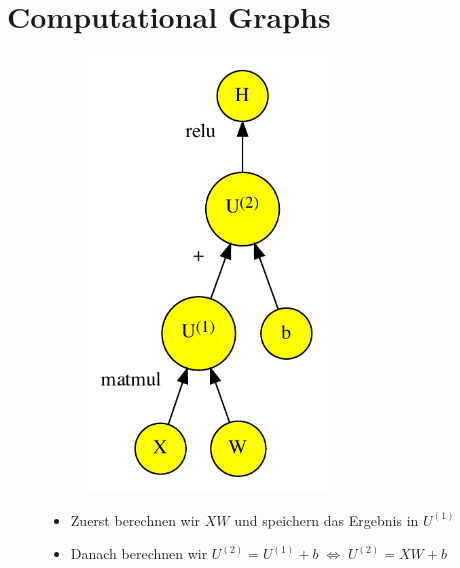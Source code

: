 \documentclass[t]{beamer}
\begin{document}
\section{Computational Graphs}
\begin{frame}
    \begin{figure}
        \centering
        \begin{minipage}{0.45\textwidth}
            \begin{figure}[]
                \centering
                \includegraphics[width=0.7\textwidth]{../plots/computational-graph-c-crop.pdf}
            \end{figure}
        \end{minipage}\hfill
        \begin{minipage}{0.45\textwidth}
            \begin{itemize}
                \item Zuerst berechnen wir \(XW\) und speichern das Ergebnis in \(U^{(1)}\)
                \item Danach berechnen wir \(U^{(2)} = U^{(1)} + b \; \Leftrightarrow \; U^{(2)} = XW + b\)

\end{itemize}
\end{minipage}
\end{figure}
\end{frame}
\end{document}
